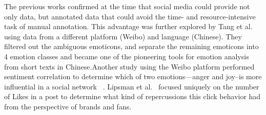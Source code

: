 \documentclass[12pt,a4paper]{report}
\theoremstyle{definition}
\begin{document}
\begin{CJK}{UTF8}{bsmi}
    \par The previous works confirmed at the time that social media could provide not only data, but annotated data that could avoid the time- and resource-intensive task of manual annotation. This advantage was further explored by Tang et al.~\cite{tang2013emotion} using data from a different platform (Weibo) and language (Chinese). They filtered out the ambiguous emoticons, and separate the remaining emoticons into 4 emotion classes and became one of the pioneering tools for emotion analysis from short texts in Chinese.Another study using the Weibo platform performed sentiment correlation to determine which of two emotions—anger and joy–is more influential in a social network ~\cite{fan2014anger}. Lipsman et al.~\cite{lipsman2012power}  focused uniquely on the number of Likes in a post to determine what kind of repercussions this click behavior had from the perspective of brands and fans.

\end{CJK}
\end{document}
